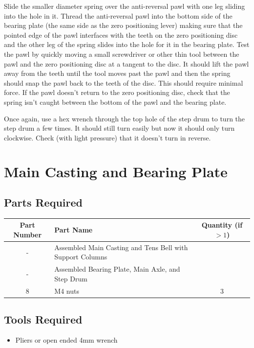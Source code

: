 \documentclass[openany]{book}
\begin{document}
Slide the smaller diameter spring over the anti-reversal pawl with one leg sliding into the hole in it. Thread the anti-reversal pawl into the bottom side of the bearing plate (the same side as the zero positioning lever) making sure that the pointed edge of the pawl interfaces with the teeth on the zero positioning disc and the other leg of the spring slides into the hole for it in the bearing plate. Test the pawl by quickly moving a small screwdriver or other thin tool between the pawl and the zero positioning disc at a tangent to the disc. It should lift the pawl away from the teeth until the tool moves past the pawl and then the spring should snap the pawl back to the teeth of the disc. This should require minimal force. If the pawl doesn’t return to the zero positioning disc, check that the spring isn’t caught between the bottom of the pawl and the bearing plate. 

Once again, use a hex wrench through the top hole of the step drum to turn the step drum a few times. It should still turn easily but now it should only turn clockwise. Check (with light pressure) that it doesn’t turn in reverse.



\chapter{Main Casting and Bearing Plate}
\section{Parts Required}
\begin{table}[!ht]
	\centering
	\begin{tabular}{clc}
		Part Number & Part Name & Quantity (if $>1$) \\ \hline
		- & Assembled Main Casting and Tens Bell with Support Columns & \\
		- & Assembled Bearing Plate, Main Axle, and Step Drum & \\ \hline \hline
		8 & M4 nuts & 3
	\end{tabular}
\end{table}

\section{Tools Required}
\begin{itemize}
	\item Pliers or open ended 4mm wrench
\end{itemize}
\end{document}
